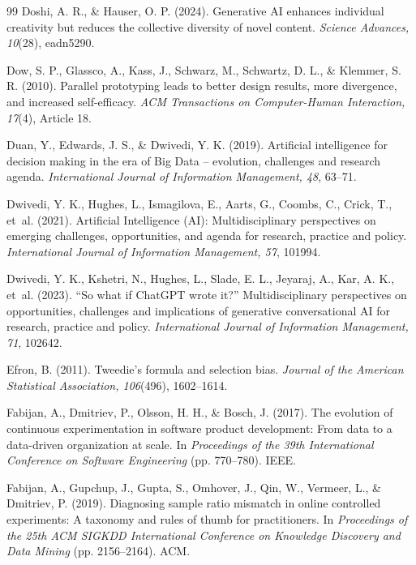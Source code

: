 \begin{thebibliography}{99}
 Doshi, A. R., \& Hauser, O. P. (2024). Generative AI enhances individual creativity but reduces the collective diversity of novel content. \textit{Science Advances, 10}(28), eadn5290. 

 Dow, S. P., Glassco, A., Kass, J., Schwarz, M., Schwartz, D. L., \& Klemmer, S. R. (2010). Parallel prototyping leads to better design results, more divergence, and increased self-efficacy. \textit{ACM Transactions on Computer-Human Interaction, 17}(4), Article 18. 

 Duan, Y., Edwards, J. S., \& Dwivedi, Y. K. (2019). Artificial intelligence for decision making in the era of Big Data -- evolution, challenges and research agenda. \textit{International Journal of Information Management, 48}, 63--71. 

 Dwivedi, Y. K., Hughes, L., Ismagilova, E., Aarts, G., Coombs, C., Crick, T., et~al. (2021). Artificial Intelligence (AI): Multidisciplinary perspectives on emerging challenges, opportunities, and agenda for research, practice and policy. \textit{International Journal of Information Management, 57}, 101994. 

 Dwivedi, Y. K., Kshetri, N., Hughes, L., Slade, E. L., Jeyaraj, A., Kar, A. K., et~al. (2023). ``So what if ChatGPT wrote it?'' Multidisciplinary perspectives on opportunities, challenges and implications of generative conversational AI for research, practice and policy. \textit{International Journal of Information Management, 71}, 102642. 

 Efron, B. (2011). Tweedie's formula and selection bias. \textit{Journal of the American Statistical Association, 106}(496), 1602--1614. 

 Fabijan, A., Dmitriev, P., Olsson, H. H., \& Bosch, J. (2017). The evolution of continuous experimentation in software product development: From data to a data-driven organization at scale. In \textit{Proceedings of the 39th International Conference on Software Engineering} (pp. 770--780). IEEE. 

 Fabijan, A., Gupchup, J., Gupta, S., Omhover, J., Qin, W., Vermeer, L., \& Dmitriev, P. (2019). Diagnosing sample ratio mismatch in online controlled experiments: A taxonomy and rules of thumb for practitioners. In \textit{Proceedings of the 25th ACM SIGKDD International Conference on Knowledge Discovery and Data Mining} (pp. 2156--2164). ACM. 


\end{thebibliography}
